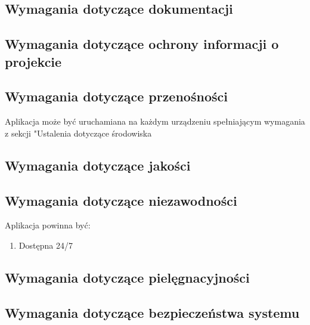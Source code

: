 \documentclass[12pt,a4paper]{report}
\begin{document}
\subsection{Wymagania dotyczące dokumentacji}
\subsection{Wymagania dotyczące ochrony informacji o projekcie}
\subsection{Wymagania dotyczące przenośności}
	Aplikacja może być uruchamiana na każdym urządzeniu spełniającym wymagania z sekcji "Ustalenia dotyczące środowiska
\subsection{Wymagania dotyczące jakości}
\subsection{Wymagania dotyczące niezawodności}
	Aplikacja powinna być:
	\begin{enumerate}
		\item Dostępna 24/7
	\end{enumerate}	 
\subsection{Wymagania dotyczące pielęgnacyjności}
\subsection{Wymagania dotyczące bezpieczeństwa systemu}
\end{document}
